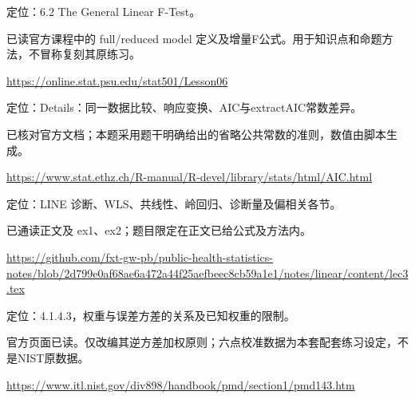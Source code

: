 \par\noindent\begin{minipage}{\linewidth}\label{src:PSU-GENERAL-F}
\par
定位：6.2 The General Linear F-Test。\par
已读官方课程中的 full/reduced model 定义及增量F公式。用于知识点和命题方法，不冒称复刻其原练习。\par
{\small\url{https://online.stat.psu.edu/stat501/Lesson06}}\par
\end{minipage}\par\medskip

\par\noindent\begin{minipage}{\linewidth}\label{src:R-AIC}
\par
定位：Details：同一数据比较、响应变换、AIC与extractAIC常数差异。\par
已核对官方文档；本题采用题干明确给出的省略公共常数的准则，数值由脚本生成。\par
{\small\url{https://www.stat.ethz.ch/R-manual/R-devel/library/stats/html/AIC.html}}\par
\end{minipage}\par\medskip

\par\noindent\begin{minipage}{\linewidth}\label{src:NOTE-L3}
\par
定位：LINE 诊断、WLS、共线性、岭回归、诊断量及偏相关各节。\par
已通读正文及 ex1、ex2；题目限定在正文已给公式及方法内。\par
{\small\url{https://github.com/fxt-gw-pb/public-health-statistics-notes/blob/2d799e0af68ae6a472a44f25aefbeec8cb59a1e1/notes/linear/content/lec3.tex}}\par
\end{minipage}\par\medskip

\par\noindent\begin{minipage}{\linewidth}\label{src:NIST-WLS}
\par
定位：4.1.4.3，权重与误差方差的关系及已知权重的限制。\par
官方页面已读。仅改编其逆方差加权原则；六点校准数据为本套配套练习设定，不是NIST原数据。\par
{\small\url{https://www.itl.nist.gov/div898/handbook/pmd/section1/pmd143.htm}}\par
\end{minipage}\par\medskip

